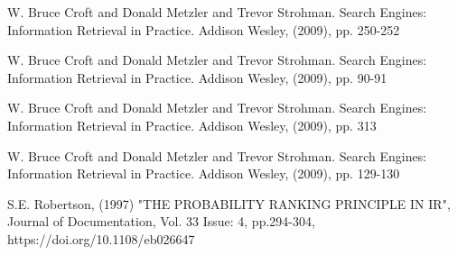 \documentclass[runningheads]{llncs}
\begin{document}
%

\begin{thebibliography}{8}

W. Bruce Croft and Donald Metzler and Trevor Strohman. Search Engines: Information Retrieval in Practice. Addison Wesley, (2009), pp. 250-252

W. Bruce Croft and Donald Metzler and Trevor Strohman. Search Engines: Information Retrieval in Practice. Addison Wesley, (2009), pp. 90-91

W. Bruce Croft and Donald Metzler and Trevor Strohman. Search Engines: Information Retrieval in Practice. Addison Wesley, (2009), pp. 313

W. Bruce Croft and Donald Metzler and Trevor Strohman. Search Engines: Information Retrieval in Practice. Addison Wesley, (2009), pp. 129-130

S.E. Robertson, (1997) "THE PROBABILITY RANKING PRINCIPLE IN IR", Journal of Documentation, Vol. 33 Issue: 4, pp.294-304, https://doi.org/10.1108/eb026647

\end{thebibliography}

\begin{figure}[h!]
\end{figure}
\end{document}
